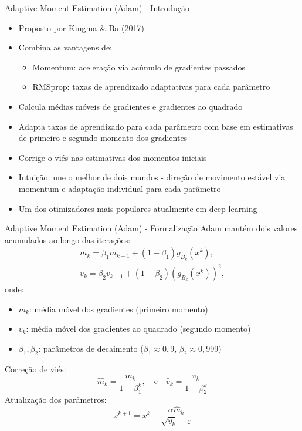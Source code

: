 \documentclass[aspectratio=1610]{beamer}
\begin{document}
\begin{frame}{Adaptive Moment Estimation (Adam) - Introdução}
\begin{itemize}
    \item Proposto por Kingma \& Ba (2017)
    \item Combina as vantagens de:
    \begin{itemize}
        \item Momentum: aceleração via acúmulo de gradientes passados
        \item RMSprop: taxas de aprendizado adaptativas para cada parâmetro
    \end{itemize}
    \item Calcula médias móveis de gradientes e gradientes ao quadrado
    \item Adapta taxas de aprendizado para cada parâmetro com base em estimativas de primeiro e segundo momento dos gradientes
    \item Corrige o viés nas estimativas dos momentos iniciais
    \item Intuição: une o melhor de dois mundos - direção de movimento estável via momentum e adaptação individual para cada parâmetro
    \item Um dos otimizadores mais populares atualmente em deep learning
\end{itemize}
\end{frame}

\begin{frame}{Adaptive Moment Estimation (Adam) - Formalização}
\small  %
Adam mantém dois valores acumulados ao longo das iterações:
\vspace{-4pt}
\begin{gather}
    m_k = \beta_1 m_{k-1} + (1 - \beta_1) g_{B_k}(x^k), \\
    v_k = \beta_2 v_{k-1} + (1 - \beta_2) (g_{B_k}(x^k))^2,
\end{gather}
\vspace{-5pt}
onde:

\begin{itemize}\setlength{\itemsep}{0pt}
    \item $m_k$: média móvel dos gradientes (primeiro momento)
    \item $v_k$: média móvel dos gradientes ao quadrado (segundo momento)
    \item $\beta_1, \beta_2$: parâmetros de decaimento ($\beta_1 \approx 0,9$, $\beta_2 \approx 0,999$)
\end{itemize}
\vspace{-5pt}
Correção de viés:
\vspace{-4pt}
\begin{equation}
    \hat{m}_k = \frac{m_k}{1 - \beta_1^k}, \quad \mbox{e} \quad
    \hat{v}_k = \frac{v_k}{1 - \beta_2^k}
\end{equation}
\vspace{-8pt}
Atualização dos parâmetros:
\vspace{-4pt}
\begin{equation}
    x^{k+1} = x^k - \frac{\alpha \hat{m}_k}{\sqrt{\hat{v}_k} + \varepsilon}
\end{equation}
\end{frame}
\end{document}
